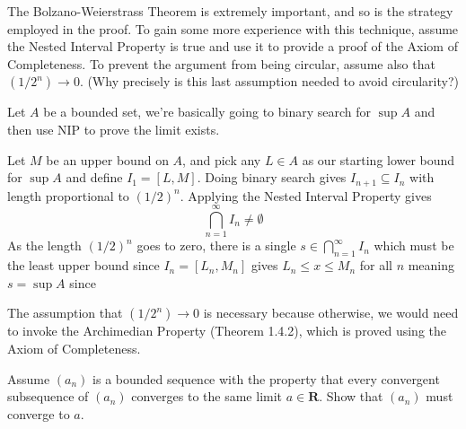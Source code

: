 \begin{solution}
\end{solution}

\begin{exercise}
  The Bolzano-Weierstrass Theorem is extremely important, and so is the strategy employed in the proof. To gain some more experience with this technique, assume the Nested Interval Property is true and use it to provide a proof of the Axiom of Completeness. To prevent the argument from being circular, assume also that $\left(1 / 2^{n}\right) \rightarrow 0$. (Why precisely is this last assumption needed to avoid circularity?)
\end{exercise}

\begin{solution}
  Let $A$ be a bounded set, we're basically going to binary search for $\sup A$ and then use NIP to prove the limit exists.

  Let $M$ be an upper bound on $A$, and pick any $L \in A$ as our starting lower bound for $\sup A$ and define $I_1 = [L, M]$. Doing binary search gives $I_{n+1} \subseteq I_n$ with length proportional to $(1/2)^n$. Applying the Nested Interval Property gives
  $$
  \bigcap_{n=1}^\infty I_n \ne \emptyset
  $$
  As the length $(1/2)^n$ goes to zero, there is a single $s \in \bigcap_{n=1}^\infty I_n$ which must be the least upper bound since $I_n = [L_n, M_n]$ gives $L_n \le x \le M_n$ for all $n$ meaning $s = \sup A$ since

  The assumption that $\left(1 / 2^{n}\right) \rightarrow 0$ is necessary because otherwise, we would need to invoke the Archimedian Property (Theorem 1.4.2), which is proved using the Axiom of Completeness.
\end{solution}

\begin{exercise}
  Assume $\left(a_{n}\right)$ is a bounded sequence with the property that every convergent subsequence of $\left(a_{n}\right)$ converges to the same limit $a \in \mathbf{R}$. Show that $\left(a_{n}\right)$ must converge to $a$.
\end{exercise}

